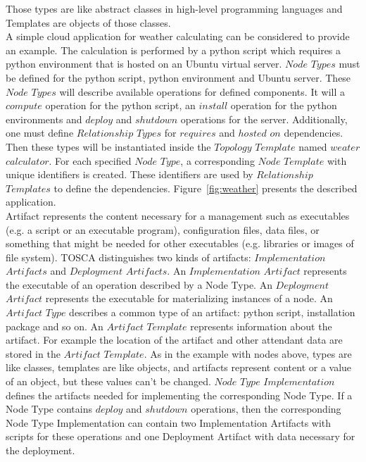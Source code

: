 Those types are like abstract classes in high-level programming languages and Templates are objects of those classes.\\
A simple cloud application for weather calculating can be considered to provide an example. 
The calculation is performed by a python script which requires a python environment that is hosted on an Ubuntu virtual server.
$Node$ $Types$ must be defined for the python script, python environment and Ubuntu server.  
These $Node$ $Types$ will describe available operations for defined components.
It will a $compute$ operation for the python script, an $install$ operation for the python environments and $deploy$ and $shutdown$ operations for the server.
Additionally, one must define $Relationship$ $Types$ for $requires$ and $hosted$ $on$ dependencies.
Then these types will be instantiated inside the $Topology$ $Template$ named $weater$ $calculator$.
For each specified $Node$ $Type$, a corresponding $Node$ $Template$ with unique identifiers is created.
These identifiers are used by $Relationship$ $Templates$ to define the dependencies.
Figure~\ref{fig:weather} presents the described application. \\
Artifact represents the content necessary for a management such as executables (e.g. a script or an executable program), configuration files, data files, or something that might be needed for other executables (e.g. libraries or images of file system).
TOSCA distinguishes two kinds of artifacts: $Implementation$ $Artifacts$ and $Deployment$ $Artifacts$.
An $Implementation$ $Artifact$ represents the executable of an operation described by a Node Type.
An $Deployment$ $Artifact$ represents the executable for materializing instances of a node.
An $Artifact$ $Type$ describes a common type of an artifact: python script, installation package and so on.
An $Artifact$ $Template$ represents information about the artifact. 
For example the location of the artifact and other attendant data are stored in the $Artifact$ $Template$. 
As in the example with nodes above, types are like classes, templates are like objects, and artifacts represent content or a value of an object, but these values can't be changed. %
$Node$ $Type$ $Implementation$ defines the artifacts needed for implementing the corresponding Node Type.
If a Node Type contains $deploy$ and $shutdown$ operations, then the corresponding Node Type Implementation can contain two Implementation Artifacts with scripts for these operations and one Deployment Artifact with data necessary for the deployment. %
